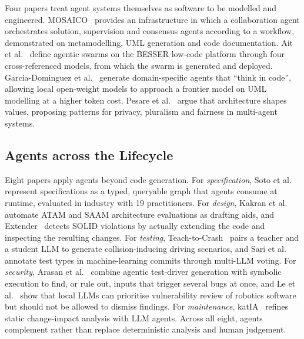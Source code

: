 Four papers treat agent systems themselves as software to be modelled and engineered. MOSAICO~\cite{agdev26:vu} provides an infrastructure in which a collaboration agent orchestrates solution, supervision and consensus agents according to a workflow, demonstrated on metamodelling, UML generation and code documentation. Ait et al.~\cite{agdev26:ait} define agentic swarms on the BESSER low-code platform through four cross-referenced models, from which the swarm is generated and deployed. Garcia-Dominguez et al.~\cite{agdev26:garciadominguez} generate domain-specific agents that ``think in code'', allowing local open-weight models to approach a frontier model on UML modelling at a higher token cost. Pesare et al.~\cite{agdev26:pesare} argue that architecture shapes values, proposing patterns for privacy, pluralism and fairness in multi-agent systems.

\subsection{Agents across the Lifecycle}

Eight papers apply agents beyond code generation. For \emph{specification}, Soto et al.~\cite{agdev26:soto} represent specifications as a typed, queryable graph that agents consume at runtime, evaluated in industry with 19 practitioners. For \emph{design}, Kakran et al.~\cite{agdev26:kakran} automate ATAM and SAAM architecture evaluations as drafting aids, and Extender~\cite{agdev26:chen} detects SOLID violations by actually extending the code and inspecting the resulting changes. For \emph{testing}, Teach-to-Crash~\cite{agdev26:ghazal} pairs a teacher and a student LLM to generate collision-inducing driving scenarios, and Sari et al.~\cite{agdev26:sari} annotate test types in machine-learning commits through multi-LLM voting. For \emph{security}, Arasan et al.~\cite{agdev26:arasan} combine agentic test-driver generation with symbolic execution to find, or rule out, inputs that trigger several bugs at once, and Le et al.~\cite{agdev26:le} show that local LLMs can prioritise vulnerability review of robotics software but should not be allowed to dismiss findings. For \emph{maintenance}, katIA~\cite{agdev26:stengg} refines static change-impact analysis with LLM agents. Across all eight, agents complement rather than replace deterministic analysis and human judgement.
